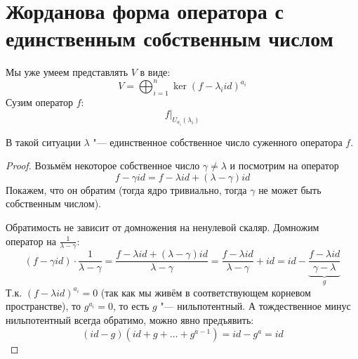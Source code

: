 \section{Жорданова форма оператора с единственным собственным числом}
\begin{theorem} 
Мы уже умеем представлять $V$ в виде:
\[ V = \bigoplus_{i=1}^n \ker (f - \lambda_i id)^{a_i} \]
Сузим оператор $f$:
\[ f\biggr|_{U_{a_i}(\lambda_i)} \]

В такой ситуации $\lambda$ "--- единственное собственное число суженного оператора $f$.
\end{theorem}

\begin{proof}
	Возьмём некоторое собственное число $\gamma \neq \lambda$
	и посмотрим на оператор
	\[f - \gamma id = f - \lambda id + (\lambda - \gamma) id\]
	Покажем, что он обратим (тогда ядро тривиально, тогда $\gamma$ не может быть собственным числом).

	Обратимость не зависит от домножения на ненулевой скаляр.
	Домножим оператор на $\frac{1}{\lambda - \gamma}$:
	\[
	(f - \gamma id) \cdot \frac{1}{\lambda - \gamma}
	=
	\frac{f - \lambda id + (\lambda - \gamma) id}{\lambda - \gamma}
	=
	\frac{f - \lambda id}{\lambda - \gamma} + id
	=
	id - \underbrace{\frac{f - \lambda id}{\gamma - \lambda}}_{g}
	\]
	Т.к. $(f-\lambda id)^{a_i} = 0$ (так как мы живём в соответствующем корневом пространстве), то $g^{a_i} = 0$, то есть $g$ "--- нильпотентный.
	А тождественное минус нильпотентный всегда обратимо, можно явно предъявить:
	\[
	(id - g)(id + g + \dots + g^{a-1}) = id - g^a = id
	\]
\end{proof}

